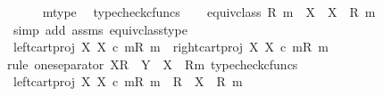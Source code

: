\begin{isabellebody}
\ \ \ \ \isamarkupfalse%
\ m{\isacharunderscore}{\kern0pt}type\ \isamarkupfalse%
\ typecheck{\isacharunderscore}{\kern0pt}cfuncs\isanewline
\ \ \isamarkupfalse%
\ {\isachardoublequoteopen}equiv{\isacharunderscore}{\kern0pt}class\ {\isacharparenleft}{\kern0pt}R{\isacharcomma}{\kern0pt}\ m{\isacharparenright}{\kern0pt}\ {\isacharcolon}{\kern0pt}\ X\ {\isasymrightarrow}\ X\ {\isasymsslash}\ {\isacharparenleft}{\kern0pt}R{\isacharcomma}{\kern0pt}\ m{\isacharparenright}{\kern0pt}{\isachardoublequoteclose}\isanewline
\ \ \ \ \isamarkupfalse%
\ {\isacharparenleft}{\kern0pt}simp\ add{\isacharcolon}{\kern0pt}\ assms\ equiv{\isacharunderscore}{\kern0pt}class{\isacharunderscore}{\kern0pt}type{\isacharparenright}{\kern0pt}\isanewline
\ \ \isamarkupfalse%
\ {\isachardoublequoteopen}{\isacharbrackleft}{\kern0pt}left{\isacharunderscore}{\kern0pt}cart{\isacharunderscore}{\kern0pt}proj\ X\ X\ {\isasymcirc}\isactrlsub c\ m{\isacharbrackright}{\kern0pt}\isactrlbsub {\isacharparenleft}{\kern0pt}R{\isacharcomma}{\kern0pt}\ m{\isacharparenright}{\kern0pt}\isactrlesub \ {\isacharequal}{\kern0pt}\ {\isacharbrackleft}{\kern0pt}right{\isacharunderscore}{\kern0pt}cart{\isacharunderscore}{\kern0pt}proj\ X\ X\ {\isasymcirc}\isactrlsub c\ m{\isacharbrackright}{\kern0pt}\isactrlbsub {\isacharparenleft}{\kern0pt}R{\isacharcomma}{\kern0pt}\ m{\isacharparenright}{\kern0pt}\isactrlesub {\isachardoublequoteclose}\isanewline
\ \ \isamarkupfalse%
{\isacharparenleft}{\kern0pt}rule\ one{\isacharunderscore}{\kern0pt}separator{\isacharbrackleft}{\kern0pt}\ X{\isacharequal}{\kern0pt}{\isachardoublequoteopen}R{\isachardoublequoteclose}{\isacharcomma}{\kern0pt}\ \ Y\ {\isacharequal}{\kern0pt}\ {\isachardoublequoteopen}X\ {\isasymsslash}\ {\isacharparenleft}{\kern0pt}R{\isacharcomma}{\kern0pt}m{\isacharparenright}{\kern0pt}{\isachardoublequoteclose}{\isacharbrackright}{\kern0pt}{\isacharcomma}{\kern0pt}\ typecheck{\isacharunderscore}{\kern0pt}cfuncs{\isacharparenright}{\kern0pt}\isanewline
\ \ \ \ \isamarkupfalse%
\ {\isachardoublequoteopen}{\isacharbrackleft}{\kern0pt}left{\isacharunderscore}{\kern0pt}cart{\isacharunderscore}{\kern0pt}proj\ X\ X\ {\isasymcirc}\isactrlsub c\ m{\isacharbrackright}{\kern0pt}\isactrlbsub {\isacharparenleft}{\kern0pt}R{\isacharcomma}{\kern0pt}\ m{\isacharparenright}{\kern0pt}\isactrlesub \ {\isacharcolon}{\kern0pt}\ R\ {\isasymrightarrow}\ X\ {\isasymsslash}\ {\isacharparenleft}{\kern0pt}R{\isacharcomma}{\kern0pt}\ m{\isacharparenright}{\kern0pt}{\isachardoublequoteclose}\isanewline

\end{isabellebody}
